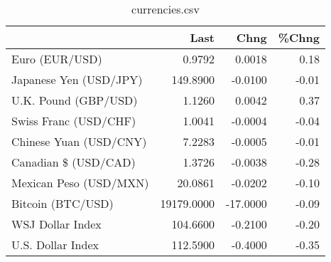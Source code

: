 \documentclass{article}%
\begin{document}
%


\begin{table}[htbp]%
\caption{currencies.csv}%
\centering%
\begin{adjustbox}{width=1\textwidth}%
\begin{tabular}{lrrr}
\toprule
                       &       Last &     Chng &  \%Chng \\
\midrule
        Euro (EUR/USD) &     0.9792 &   0.0018 &   0.18 \\
Japanese Yen (USD/JPY) &   149.8900 &  -0.0100 &  -0.01 \\
  U.K. Pound (GBP/USD) &     1.1260 &   0.0042 &   0.37 \\
 Swiss Franc (USD/CHF) &     1.0041 &  -0.0004 &  -0.04 \\
Chinese Yuan (USD/CNY) &     7.2283 &  -0.0005 &  -0.01 \\
  Canadian \$ (USD/CAD) &     1.3726 &  -0.0038 &  -0.28 \\
Mexican Peso (USD/MXN) &    20.0861 &  -0.0202 &  -0.10 \\
     Bitcoin (BTC/USD) & 19179.0000 & -17.0000 &  -0.09 \\
      WSJ Dollar Index &   104.6600 &  -0.2100 &  -0.20 \\
     U.S. Dollar Index &   112.5900 &  -0.4000 &  -0.35 \\
\bottomrule
\end{tabular}
%
\end{adjustbox}%
\end{table}

%
\end{document}
